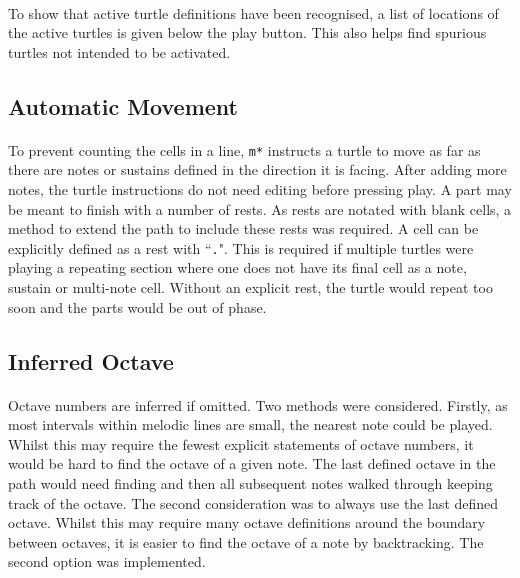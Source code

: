 \paragraph{} To show that active turtle definitions have been recognised, a list of locations of the active turtles is given below the play button. This also helps find spurious turtles not intended to be activated.

\subsection{Automatic Movement}

\paragraph{} To prevent counting the cells in a line, \texttt{m*} instructs a turtle to move as far as there are notes or sustains defined in the direction it is facing. After adding more notes, the turtle instructions do not need editing before pressing play. A part may be meant to finish with a number of rests. As rests are notated with blank cells, a method to extend the path to include these rests was required. A cell can be explicitly defined as a rest with ``\texttt{.}". This is required if multiple turtles were playing a repeating section where one does not have its final cell as a note, sustain or multi-note cell. Without an explicit rest, the turtle would repeat too soon and the parts would be out of phase.

\subsection{Inferred Octave}

\paragraph{} Octave numbers are inferred if omitted. Two methods were considered. Firstly, as most intervals within melodic lines are small, the nearest note could be played.
Whilst this may require the fewest explicit statements of octave numbers, it would be hard to find the octave of a given note. The last defined octave in the path would need finding and then all subsequent notes walked through keeping track of the octave. The second consideration was to always use the last defined octave. Whilst this may require many octave definitions around the boundary between octaves, it is easier to find the octave of a note by backtracking. The second option was implemented.

